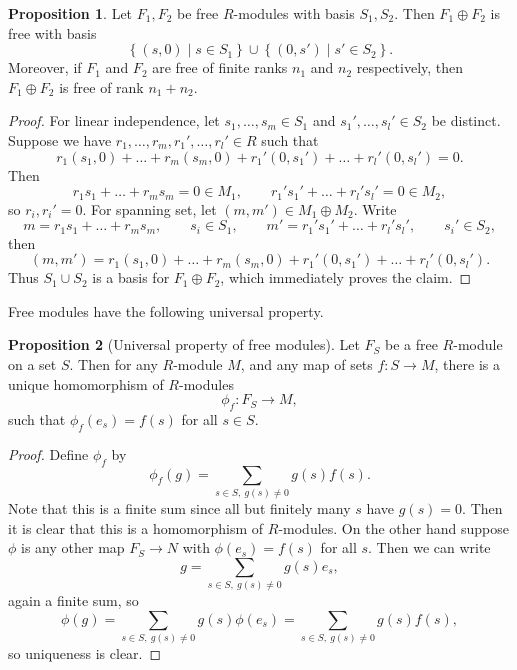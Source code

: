 \documentclass{article}
\newcommand{\rb}[1]{\left( #1 \right)}
\newcommand{\cb}[1]{\left\{ #1 \right\}}
\theoremstyle{definition}\newtheorem{definition}{Definition}[subsection]
\theoremstyle{definition}\newtheorem{remark}[definition]{Remark}
\theoremstyle{definition}\newtheorem*{example}{Example}
\theoremstyle{definition}\newtheorem*{note}{Note}
\newtheorem{proposition}[definition]{Proposition}
\begin{document}
\begin{proposition}
Let $ F_1, F_2 $ be free $ R $-modules with basis $ S_1, S_2 $. Then $ F_1 \oplus F_2 $ is free with basis
$$ \cb{\rb{s, 0} \mid s \in S_1} \cup \cb{\rb{0, s'} \mid s' \in S_2}. $$ Moreover, if $ F_1 $ and $ F_2 $ are free of finite ranks $ n_1 $ and $ n_2 $ respectively, then $ F_1 \oplus F_2 $ is free of rank $ n_1 + n_2 $.
\end{proposition}

\begin{proof}
For linear independence, let $ s_1, \dots, s_m \in S_1 $ and $ s_1', \dots, s_l' \in S_2 $ be distinct. Suppose we have $ r_1, \dots, r_m, r_1', \dots, r_l' \in R $ such that
$$ r_1\rb{s_1, 0} + \dots + r_m\rb{s_m, 0} + r_1'\rb{0, s_1'} + \dots + r_l'\rb{0, s_l'} = 0. $$
Then
$$ r_1s_1 + \dots + r_ms_m = 0 \in M_1, \qquad r_1's_1' + \dots + r_l's_l' = 0 \in M_2, $$
so $ r_i, r_i' = 0 $. For spanning set, let $ \rb{m, m'} \in M_1 \oplus M_2 $. Write
$$ m = r_1s_1 + \dots + r_ms_m, \qquad s_i \in S_1, \qquad m' = r_1's_1' + \dots + r_l's_l', \qquad s_i' \in S_2, $$
then
$$ \rb{m, m'} = r_1\rb{s_1, 0} + \dots + r_m\rb{s_m, 0} + r_1'\rb{0, s_1'} + \dots + r_l'\rb{0, s_l'}. $$
Thus $ S_1 \cup S_2 $ is a basis for $ F_1 \oplus F_2 $, which immediately proves the claim.
\end{proof}

Free modules have the following universal property.

\begin{proposition}[Universal property of free modules]
Let $ F_S $ be a free $ R $-module on a set $ S $. Then for any $ R $-module $ M $, and any map of sets $ f : S \to M $, there is a unique homomorphism of $ R $-modules
$$ \phi_f : F_S \to M, $$
such that $ \phi_f\rb{e_s} = f\rb{s} $ for all $ s \in S $.
\end{proposition}

\begin{proof}
Define $ \phi_f $ by
$$ \phi_f\rb{g} = \sum_{s \in S, \ g\rb{s} \ne 0} g\rb{s}f\rb{s}. $$
Note that this is a finite sum since all but finitely many $ s $ have $ g\rb{s} = 0 $. Then it is clear that this is a homomorphism of $ R $-modules. On the other hand suppose $ \phi $ is any other map $ F_S \to N $ with $ \phi\rb{e_s} = f\rb{s} $ for all $ s $. Then we can write
$$ g = \sum_{s \in S, \ g\rb{s} \ne 0} g\rb{s}e_s, $$
again a finite sum, so
$$ \phi\rb{g} = \sum_{s \in S, \ g\rb{s} \ne 0} g\rb{s}\phi\rb{e_s} = \sum_{s \in S, \ g\rb{s} \ne 0} g\rb{s}f\rb{s}, $$
so uniqueness is clear.
\end{proof}
\end{document}
